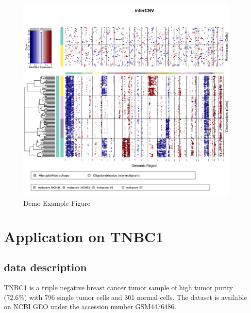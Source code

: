 \documentclass[
]{book}
\begin{document}
\begin{figure}
\centering
\includegraphics{CNV_analysis_file/figs/demo-infercnv.png}
\caption{Demo Example Figure}
\end{figure}

\hypertarget{application-on-tnbc1}{%
\section{Application on TNBC1}\label{application-on-tnbc1}}

\hypertarget{data-description}{%
\subsection{data description}\label{data-description}}

TNBC1 is a triple negative breast cancer tumor sample of high tumor purity (72.6\%) with 796 single tumor cells and 301 normal cells. The dataset is available on NCBI GEO under the accession number GSM4476486.
\end{document}

